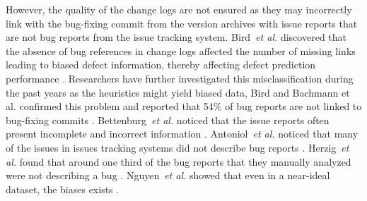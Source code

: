 \documentclass[a4paper, 12pt]{book}
\begin{document}
However, the quality of the change logs are not ensured as they may incorrectly link with the bug-fixing commit from the version archives with issue reports that are not bug reports from the issue tracking system. Bird~\emph{et al.} discovered that the absence of bug references in change logs affected the number of missing links leading to biased defect information, thereby affecting defect prediction performance \cite{bird2009fair}. Researchers have further investigated this misclassification during the past years as the heuristics might yield biased data, Bird and Bachmann et al. confirmed this problem and reported that 54\% of bug reports are not linked to bug-fixing commits \cite{bachmann2010missing,bird2009fair}. Bettenburg~\emph{et al.}  noticed that the issue reports often present incomplete and incorrect information \cite{bettenburg2008makes}. Antoniol~\emph{et al.} noticed that many of the issues in issues tracking systems did not describe bug reports \cite{antoniol2008bug}. Herzig~\emph{et al.} found that around one third of the bug reports that they manually analyzed were not describing a bug \cite{herzig2013s}. Nguyen~\emph{et al.} showed that even in a near-ideal dataset, the biases exists \cite{nguyen2010case}.
\end{document}
